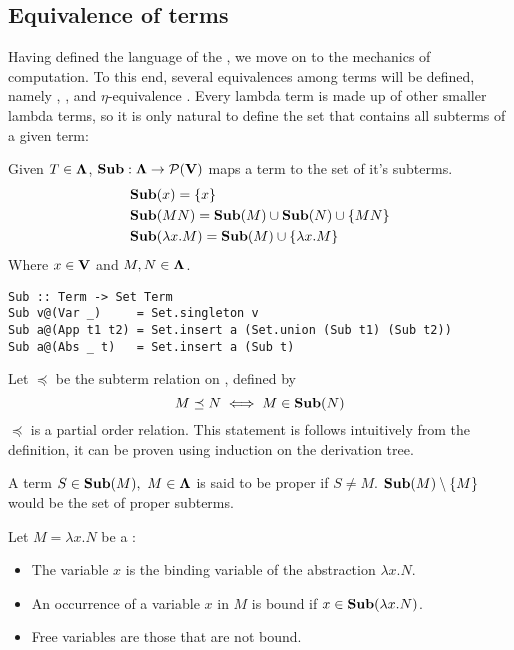 \documentclass[12pt]{book}
\newcommand{\etaequiv}{$\eta$-equivalence} %
\begin{document}
\subsection{\centering Equivalence of terms}
Having defined the language of the \lcalc, we move on to the mechanics of computation. To this end, several equivalences among terms will be defined, namely \aequiv, \bequiv, and \etaequiv
. Every lambda term is made up of other smaller lambda terms, so it is only natural to define the set that contains all subterms of a given term:
\begin{definition} Given $T \in \mathbf{\Lambda}$, $\mathbf{Sub} : \mathbf{\Lambda} \to \mathcal{P}(\mathbf{V})$ maps a term to the set of it's subterms.
  \begin{align*}
    &\mathbf{Sub}(x) = \{x\} \\
    &\mathbf{Sub}(MN) = \mathbf{Sub}(M)  \cup \mathbf{Sub}(N) \cup \{MN\} \\
    &\mathbf{Sub}(\lambda x . M) = \mathbf{Sub}(M)  \cup \{\lambda x. M\}
  \end{align*}
  Where $x \in \mathbf{V}$ and $M, N \in \mathbf{\Lambda} $.
  \begin{lstlisting}[style=haskellstyle,caption={Haskell implementation of Sub.}]
Sub :: Term -> Set Term
Sub v@(Var _)     = Set.singleton v
Sub a@(App t1 t2) = Set.insert a (Set.union (Sub t1) (Sub t2))
Sub a@(Abs _ t)   = Set.insert a (Sub t)
  \end{lstlisting}
\end{definition}
\begin{remark}
  Let \( \preceq \) be the subterm relation on \lterms, defined by
  \[
    M \preceq N \iff M \in \mathbf{Sub}( N )
  \]
  \( \preceq \) is a partial order relation. This statement is follows intuitively from the definition, it can be proven using induction on the derivation tree.
\end{remark}
\begin{definition} A term $ S \in \mathbf{Sub}(M), \ M \in \mathbf{\Lambda}$ is said to be proper if $S \neq M$. $\mathbf{Sub}(M) \setminus \{M\}$ would be the set of proper subterms.
\end{definition}
\begin{definition} Let \( M = \lambda x. N \) be a \lterm:
  \begin{itemize}
  \item The variable \( x \) is the binding variable of the abstraction \( \lambda x. N \).
  \item An occurrence of a variable \( x \) in \( M \) is bound if \( x \in \mathbf{Sub}( \lambda x. N ) \).
  \item Free variables are those that are not bound.
  \end{itemize}
\end{definition}
\end{document}
